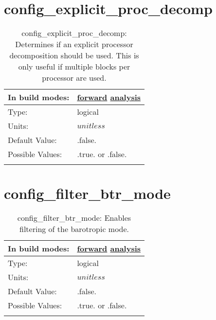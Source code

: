 \section[config\_explicit\_proc\_decomp]{config\_explicit\_proc\_decomp}
\label{sec:nm_sec_config_explicit_proc_decomp}
\begin{center}
\begin{longtable}{| p{2.0in} || p{4.0in} |}
    \hline
    In build modes: & \hyperref[subsec:forward_nm_tab_decomposition]{forward} \hyperref[subsec:analysis_nm_tab_decomposition]{analysis} \\
    \hline
    Type: & logical \\
    \hline
    Units: & $unitless$ \\
    \hline
    Default Value: & .false. \\
    \hline
    Possible Values: & .true. or .false. \\
    \hline
    \caption{config\_explicit\_proc\_decomp: Determines if an explicit processor decomposition should be used. This is only useful if multiple blocks per processor are used.}
\end{longtable}
\end{center}
\section[config\_filter\_btr\_mode]{config\_filter\_btr\_mode}
\label{sec:nm_sec_config_filter_btr_mode}
\begin{center}
\begin{longtable}{| p{2.0in} || p{4.0in} |}
    \hline
    In build modes: & \hyperref[subsec:forward_nm_tab_debug]{forward} \hyperref[subsec:analysis_nm_tab_debug]{analysis} \\
    \hline
    Type: & logical \\
    \hline
    Units: & $unitless$ \\
    \hline
    Default Value: & .false. \\
    \hline
    Possible Values: & .true. or .false. \\
    \hline
    \caption{config\_filter\_btr\_mode: Enables filtering of the barotropic mode.}
\end{longtable}
\end{center}
